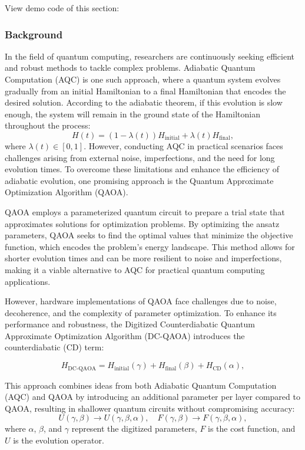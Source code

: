

View demo code of this section:  \ 

\subsubsection{Background}
In the field of quantum computing, researchers are continuously seeking efficient and robust methods to tackle complex problems. Adiabatic Quantum Computation (AQC) is one such approach, where a quantum system evolves gradually from an initial Hamiltonian to a final Hamiltonian that encodes the desired solution. According to the adiabatic theorem, if this evolution is slow enough, the system will remain in the ground state of the Hamiltonian throughout the process:
\begin{equation}
    H(t) = (1-\lambda(t))H_{\text{initial}} + \lambda(t)H_{\text{final}},
\end{equation}
where \(\lambda(t) \in [0, 1]\). However, conducting AQC in practical scenarios faces challenges arising from external noise, imperfections, and the need for long evolution times. To overcome these limitations and enhance the efficiency of adiabatic evolution, one promising approach is the Quantum Approximate Optimization Algorithm (QAOA).

QAOA employs a parameterized quantum circuit to prepare a trial state that approximates solutions for optimization problems. By optimizing the ansatz parameters, QAOA seeks to find the optimal values that minimize the objective function, which encodes the problem's energy landscape. This method allows for shorter evolution times and can be more resilient to noise and imperfections, making it a viable alternative to AQC for practical quantum computing applications.

However, hardware implementations of QAOA face challenges due to noise, decoherence, and the complexity of parameter optimization. To enhance its performance and robustness, the Digitized Counterdiabatic Quantum Approximate Optimization Algorithm (DC-QAOA) introduces the counterdiabatic (CD) term:

\begin{equation}
    H_{\text{DC-QAOA}} = H_{\text{initial}}(\gamma) + H_{\text{final}}(\beta) + H_{\text{CD}}(\alpha),
\end{equation}

This approach combines ideas from both Adiabatic Quantum Computation (AQC) and QAOA by introducing an additional parameter per layer compared to QAOA, resulting in shallower quantum circuits without compromising accuracy:
\begin{equation}
    \label{eq:evo operator}
    U(\gamma, \beta) \to U(\gamma, \beta, \alpha), \quad F(\gamma, \beta) \to F(\gamma, \beta, \alpha),
\end{equation}
where \(\alpha\), \(\beta\), and \(\gamma\) represent the digitized parameters, \(F\) is the cost function, and \(U\) is the evolution operator.

